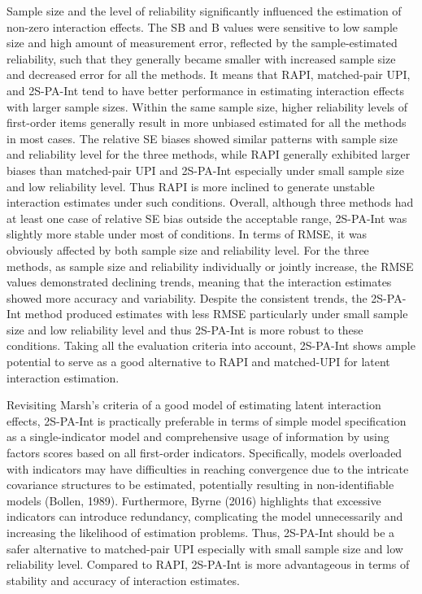 \documentclass[
  man]{apa7}
\begin{document}
Sample size and the level of reliability significantly influenced the estimation of non-zero interaction effects. The SB and B values were sensitive to low sample size and high amount of measurement error, reflected by the sample-estimated reliability, such that they generally became smaller with increased sample size and decreased error for all the methods. It means that RAPI, matched-pair UPI, and 2S-PA-Int tend to have better performance in estimating interaction effects with larger sample sizes. Within the same sample size, higher reliability levels of first-order items generally result in more unbiased estimated for all the methods in most cases. The relative SE biases showed similar patterns with sample size and reliability level for the three methods, while RAPI generally exhibited larger biases than matched-pair UPI and 2S-PA-Int especially under small sample size and low reliability level. Thus RAPI is more inclined to generate unstable interaction estimates under such conditions. Overall, although three methods had at least one case of relative SE bias outside the acceptable range, 2S-PA-Int was slightly more stable under most of conditions. In terms of RMSE, it was obviously affected by both sample size and reliability level. For the three methods, as sample size and reliability individually or jointly increase, the RMSE values demonstrated declining trends, meaning that the interaction estimates showed more accuracy and variability. Despite the consistent trends, the 2S-PA-Int method produced estimates with less RMSE particularly under small sample size and low reliability level and thus 2S-PA-Int is more robust to these conditions. Taking all the evaluation criteria into account, 2S-PA-Int shows ample potential to serve as a good alternative to RAPI and matched-UPI for latent interaction estimation.

Revisiting Marsh's criteria of a good model of estimating latent interaction effects, 2S-PA-Int is practically preferable in terms of simple model specification as a single-indicator model and comprehensive usage of information by using factors scores based on all first-order indicators. Specifically, models overloaded with indicators may have difficulties in reaching convergence due to the intricate covariance structures to be estimated, potentially resulting in non-identifiable models (Bollen, 1989). Furthermore, Byrne (2016) highlights that excessive indicators can introduce redundancy, complicating the model unnecessarily and increasing the likelihood of estimation problems. Thus, 2S-PA-Int should be a safer alternative to matched-pair UPI especially with small sample size and low reliability level. Compared to RAPI, 2S-PA-Int is more advantageous in terms of stability and accuracy of interaction estimates.
\end{document}
